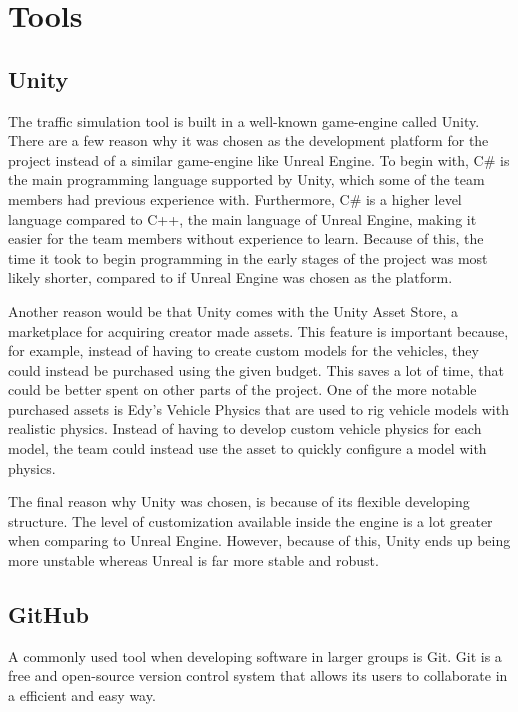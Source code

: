 
\section{Tools}

\subsection{Unity}
    The traffic simulation tool is built in a well-known game-engine called Unity. There are a few reason why it was chosen as the development platform for the project instead of a similar game-engine like Unreal Engine. To begin with, C\# is the main programming language supported by Unity, which some of the team members had previous experience with. Furthermore, C\# is a higher level language compared to C++, the main language of Unreal Engine, making it easier for the team members without experience to learn. Because of this, the time it took to begin programming in the early stages of the project was most likely shorter, compared to if Unreal Engine was chosen as the platform.

    Another reason would be that Unity comes with the Unity Asset Store, a marketplace for acquiring creator made assets. This feature is important because, for example, instead of having to create custom models for the vehicles, they could instead be purchased using the given budget. This saves a lot of time, that could be better spent on other parts of the project. One of the more notable purchased assets is Edy's Vehicle Physics that are used to rig vehicle models with realistic physics. Instead of having to develop custom vehicle physics for each model, the team could instead use the asset to quickly configure a model with physics.

    The final reason why Unity was chosen, is because of its flexible developing structure. The level of customization available inside the engine is a lot greater when comparing to Unreal Engine. However, because of this, Unity ends up being more unstable whereas Unreal is far more stable and robust. 

\subsection{GitHub}
    A commonly used tool when developing software in larger groups is Git. Git is a free and open-source version control system that allows its users to collaborate in a efficient and easy way. 


